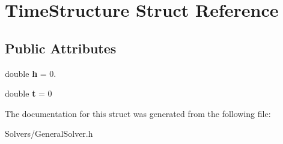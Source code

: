 \hypertarget{structTimeStructure}{}\section{Time\+Structure Struct Reference}
\label{structTimeStructure}
\subsection*{Public Attributes}
\begin{DoxyCompactItemize}
\item 
\mbox{\label{structTimeStructure_affed43a1754e3d3825115e62431e3d43}} 
double {\bfseries h} = 0.
\item 
\mbox{\label{structTimeStructure_a15205e0ecbe3c3c176c838ad4a1e1028}} 
double {\bfseries t} = 0
\end{DoxyCompactItemize}


The documentation for this struct was generated from the following file\+:\begin{DoxyCompactItemize}
\item 
Solvers/General\+Solver.\+h\end{DoxyCompactItemize}
